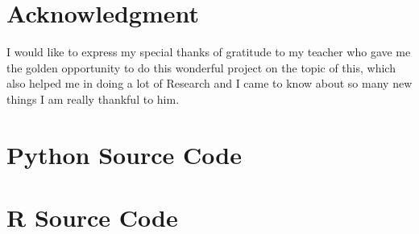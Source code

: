 \documentclass[conference]{IEEEtran}
\begin{document}



\section*{Acknowledgment}

I would like to express my special thanks of gratitude to my teacher who gave me the golden opportunity to do this wonderful project on the topic of this, which also helped me in doing a lot of Research and I came to know about so many new things I am really thankful to him.





\vspace{12pt}

\clearpage
\newpage


\appendices
\section{Python Source Code}
\label{FirstAppendix}




%
%


\section{R Source Code}
\label{SecondAppendix}

\end{document}
